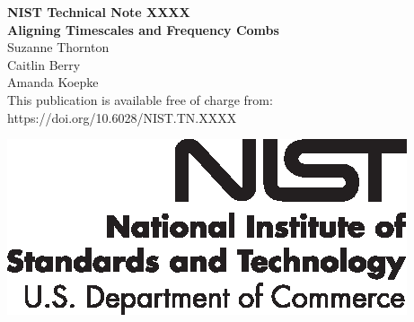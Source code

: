 \documentclass[12pt]{article}
\newcommand{\pubnumber}{XXXX}
\newcommand{\DOI}{https://doi.org/10.6028/NIST.TN.XXXX}
\begin{document}
	
	\begin{titlepage}
		\begin{flushright}
\LARGE{\textbf{NIST Technical Note \pubnumber}}\\
\vfill
\Huge{\textbf{Aligning Timescales and Frequency Combs}}\\
\vfill
\large Suzanne Thornton\\
\large Caitlin Berry\\
\large Amanda Koepke\\
\vfill
\normalsize This publication is available free of charge from:\\
\DOI\\
\vfill

\includegraphics[width=0.3\linewidth]{NIST-logo.eps}\\ 


\end{flushright}
\end{titlepage}
\end{document}
